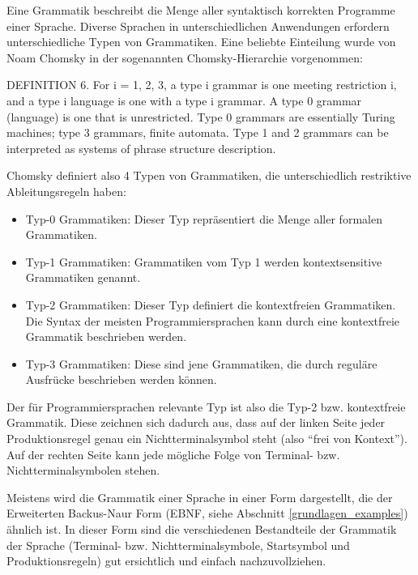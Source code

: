 Eine Grammatik beschreibt die Menge aller syntaktisch korrekten Programme einer Sprache. Diverse Sprachen in unterschiedlichen Anwendungen erfordern unterschiedliche Typen von Grammatiken. Eine beliebte Einteilung wurde von Noam Chomsky in der sogenannten Chomsky-Hierarchie vorgenommen:

\begin{myquote}DEFINITION 6. For i = 1, 2, 3, a type i grammar is one meeting restriction i, and a type i language is one with a type i grammar. A type 0 grammar (language) is one that is unrestricted. 
Type 0 grammars are essentially Turing machines; type 3 grammars, finite automata. Type 1 and 2 grammars can be interpreted as systems of phrase structure description. \cite{Chom59}
\end{myquote}

Chomsky definiert also 4 Typen von Grammatiken, die unterschiedlich restriktive Ableitungsregeln haben:

\begin{itemize}
  \item Typ-0 Grammatiken: Dieser Typ repräsentiert die Menge aller formalen Grammatiken.
  \item Typ-1 Grammatiken: Grammatiken vom Typ 1 werden kontextsensitive Grammatiken genannt.
  \item Typ-2 Grammatiken: Dieser Typ definiert die kontextfreien Grammatiken. Die Syntax der meisten Programmiersprachen kann durch eine kontextfreie Grammatik beschrieben werden.
  \item Typ-3 Grammatiken: Diese sind jene Grammatiken, die durch reguläre Ausfrücke beschrieben werden können.
\end{itemize}

Der für Programmiersprachen relevante Typ ist also die Typ-2 bzw. kontextfreie Grammatik. Diese zeichnen sich dadurch aus, dass auf der linken Seite jeder Produktionsregel genau ein Nichtterminalsymbol steht (also ``frei von Kontext''). Auf der rechten Seite kann jede mögliche Folge von Terminal- bzw. Nichtterminalsymbolen stehen.



Meistens wird die Grammatik einer Sprache in einer Form dargestellt, die der Erweiterten Backus-Naur Form (EBNF, siehe Abschnitt \ref{grundlagen_examples}) ähnlich ist. In dieser Form sind die verschiedenen Bestandteile der Grammatik der Sprache (Terminal- bzw. Nichtterminalsymbole, Startsymbol und Produktionsregeln) gut ersichtlich und einfach nachzuvollziehen.

